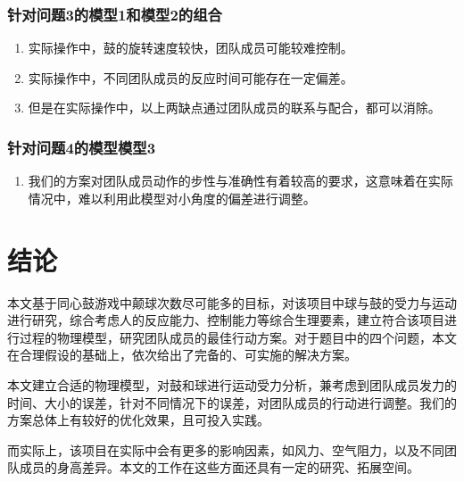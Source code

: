 \documentclass[nocover]{cumcmart}%
\begin{document}
\subsubsection{针对问题3的模型1和模型2的组合}
\begin{enumerate}[(1)]
    \item 
实际操作中，鼓的旋转速度较快，团队成员可能较难控制。
\item 
实际操作中，不同团队成员的反应时间可能存在一定偏差。
\item
但是在实际操作中，以上两缺点通过团队成员的联系与配合，都可以消除。
\end{enumerate}
\subsubsection{针对问题4的模型模型3}
\begin{enumerate}[(1)]
    \item 
    我们的方案对团队成员动作的步性与准确性有着较高的要求，这意味着在实际情况中，难以利用此模型对小角度的偏差进行调整。
\end{enumerate}
\section{结论}

本文基于同心鼓游戏中颠球次数尽可能多的目标，对该项目中球与鼓的受力与运动进行研究，综合考虑人的反应能力、控制能力等综合生理要素，建立符合该项目进行过程的物理模型，研究团队成员的最佳行动方案。对于题目中的四个问题，本文在合理假设的基础上，依次给出了完备的、可实施的解决方案。

本文建立合适的物理模型，对鼓和球进行运动受力分析，兼考虑到团队成员发力的时间、大小的误差，针对不同情况下的误差，对团队成员的行动进行调整。我们的方案总体上有较好的优化效果，且可投入实践。

而实际上，该项目在实际中会有更多的影响因素，如风力、空气阻力，以及不同团队成员的身高差异。本文的工作在这些方面还具有一定的研究、拓展空间。






\clearpage


\newpage
\appendix
\end{document}
